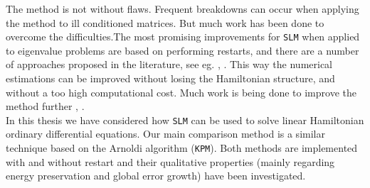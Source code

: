 \noindent The method is not without flaws. Frequent breakdowns can occur when applying the method to ill conditioned matrices. But much work has been done to overcome the difficulties.The most promising improvements for \texttt{SLM} when applied to eigenvalue problems are based on performing restarts, and there are a number of approaches proposed in the literature, see eg. \cite{SLM1}, \citep{SLM2}. This way the numerical estimations can be improved without losing the Hamiltonian structure, and without a too high computational cost. Much work is being done to improve the method further \cite{future}, \cite{benner2016solution}. \\


\noindent In this thesis we have considered how \texttt{SLM} can be used to solve linear Hamiltonian ordinary differential equations. Our main comparison method is a similar technique based on the Arnoldi algorithm (\texttt{KPM}). Both methods are implemented with and without restart and their qualitative properties (mainly regarding energy preservation and  global error growth) have been investigated.


 
